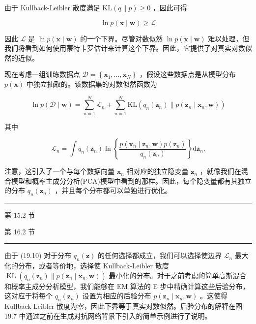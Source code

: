 \documentclass[10pt]{report}
\newcommand{\HRule}{\begin{center}\rule{0.9\linewidth}{0.2mm}\end{center}}
\begin{document}
由于 Kullback-Leibler 散度满足 \(\mathrm{{KL}}\left( {q\parallel p}\right)  \geq  0\) ，因此可得

\[
\ln p\left( {\mathbf{x} \mid  \mathbf{w}}\right)  \geq  \mathcal{L} \tag{19.9}
\]

因此 \(\mathcal{L}\) 是 \(\ln p\left( {\mathbf{x} \mid  \mathbf{w}}\right)\) 的一个下界。尽管对数似然 \(\ln p\left( {\mathbf{x} \mid  \mathbf{w}}\right)\) 难以处理，但我们将看到如何使用蒙特卡罗估计来计算这个下界。因此，它提供了对真实对数似然的近似。

现在考虑一组训练数据点 \(\mathcal{D} = \left\{  {{\mathbf{x}}_{1},\ldots ,{\mathbf{x}}_{N}}\right\}\) ，假设这些数据点是从模型分布 \(p\left( \mathbf{x}\right)\) 中独立抽取的。该数据集的对数似然函数为

\[
\ln p\left( {\mathcal{D} \mid  \mathbf{w}}\right)  = \mathop{\sum }\limits_{{n = 1}}^{N}{\mathcal{L}}_{n} + \mathop{\sum }\limits_{{n = 1}}^{N}\mathrm{{KL}}\left( {{q}_{n}\left( {\mathbf{z}}_{n}\right) \parallel p\left( {{\mathbf{z}}_{n} \mid  {\mathbf{x}}_{n},\mathbf{w}}\right) }\right)  \tag{19.10}
\]

其中

\[
{\mathcal{L}}_{n} = \int {q}_{n}\left( {\mathbf{z}}_{n}\right) \ln \left\{  \frac{p\left( {{\mathbf{x}}_{n} \mid  {\mathbf{z}}_{n},\mathbf{w}}\right) p\left( {\mathbf{z}}_{n}\right) }{{q}_{n}\left( {\mathbf{z}}_{n}\right) }\right\}  \mathrm{d}{\mathbf{z}}_{n}. \tag{19.11}
\]

注意，这引入了一个与每个数据向量 \({\mathbf{x}}_{n}\) 相对应的独立隐变量 \({\mathbf{z}}_{n}\) ，就像我们在混合模型和概率主成分分析(PCA)模型中看到的那样。因此，每个隐变量都有其独立的分布 \({q}_{n}\left( {\mathbf{z}}_{n}\right)\) ，并且每个分布都可以单独进行优化。

\HRule

第 15.2 节

第 16.2 节

\HRule

由于 (19.10) 对于分布 \({q}_{n}\left( \mathbf{z}\right)\) 的任何选择都成立，我们可以选择使边界 \({\mathcal{L}}_{n}\) 最大化的分布，或者等价地，选择使 Kullback-Leibler 散度 \(\operatorname{KL}\left( {{q}_{n}\left( {\mathbf{z}}_{n}\right) \parallel p\left( {{\mathbf{z}}_{n} \mid  {\mathbf{x}}_{n},\mathbf{w}}\right) }\right)\) 最小化的分布。对于之前考虑的简单高斯混合和概率主成分分析模型，我们能够在 EM 算法的 E 步中精确计算这些后验分布，这对应于将每个 \({q}_{n}\left( {\mathbf{z}}_{n}\right)\) 设置为相应的后验分布 \(p\left( {{\mathbf{z}}_{n} \mid  {\mathbf{x}}_{n},\mathbf{w}}\right)\) 。这使得 Kullback-Leibler 散度为零，因此下界等于真实对数似然。后验分布的解释在图 19.7 中通过之前在生成对抗网络背景下引入的简单示例进行了说明。
\end{document}
